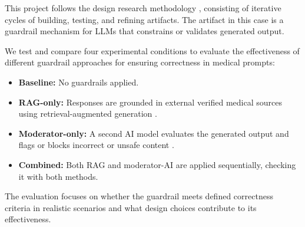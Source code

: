 %

This project follows the design research methodology \citep{wieringa2014design}, consisting of iterative cycles of building, testing, and refining artifacts.
The artifact in this case is a guardrail mechanism for LLMs that constrains or validates generated output.

We test and compare four experimental conditions to evaluate the effectiveness of different guardrail approaches for ensuring correctness in medical prompts:

\begin{itemize}
    \item \textbf{Baseline:} No guardrails applied.
    \item \textbf{RAG-only:} Responses are grounded in external verified medical sources using retrieval-augmented generation \citep{dong2024guardrails}.
    \item \textbf{Moderator-only:} A second AI model evaluates the generated output and flags or blocks incorrect or unsafe content \citep{inan2023llamaguard}.
    \item \textbf{Combined:} Both RAG and moderator-AI are applied sequentially, checking it with both methods.
\end{itemize}

The evaluation focuses on whether the guardrail meets defined correctness criteria in realistic scenarios and what design choices contribute to its effectiveness.

